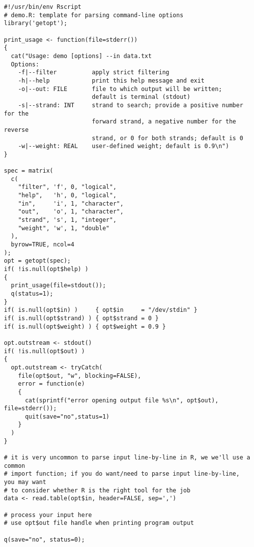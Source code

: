 \documentclass{article}
\begin{document}
\begin{verbatim}
#!/usr/bin/env Rscript
# demo.R: template for parsing command-line options
library('getopt');

print_usage <- function(file=stderr())
{
  cat("Usage: demo [options] --in data.txt
  Options:
    -f|--filter          apply strict filtering
    -h|--help            print this help message and exit
    -o|--out: FILE       file to which output will be written;
                         default is terminal (stdout)
    -s|--strand: INT     strand to search; provide a positive number for the
                         forward strand, a negative number for the reverse
                         strand, or 0 for both strands; default is 0
    -w|--weight: REAL    user-defined weight; default is 0.9\n")
}

spec = matrix(
  c(
    "filter", 'f', 0, "logical",
    "help",   'h', 0, "logical",
    "in",     'i', 1, "character",
    "out",    'o', 1, "character",
    "strand", 's', 1, "integer",
    "weight", 'w', 1, "double"
  ),
  byrow=TRUE, ncol=4
);
opt = getopt(spec);
if( !is.null(opt$help) )
{
  print_usage(file=stdout());
  q(status=1);
}
if( is.null(opt$in) )     { opt$in     = "/dev/stdin" }
if( is.null(opt$strand) ) { opt$strand = 0 }
if( is.null(opt$weight) ) { opt$weight = 0.9 }

opt.outstream <- stdout()
if( !is.null(opt$out) )
{
  opt.outstream <- tryCatch(
    file(opt$out, "w", blocking=FALSE),
    error = function(e)
    {
      cat(sprintf("error opening output file %s\n", opt$out), file=stderr());
      quit(save="no",status=1)
    }
  )
}

# it is very uncommon to parse input line-by-line in R, we we'll use a common
# import function; if you do want/need to parse input line-by-line, you may want
# to consider whether R is the right tool for the job
data <- read.table(opt$in, header=FALSE, sep=',')

# process your input here
# use opt$out file handle when printing program output

q(save="no", status=0);
\end{verbatim}
\end{document}
